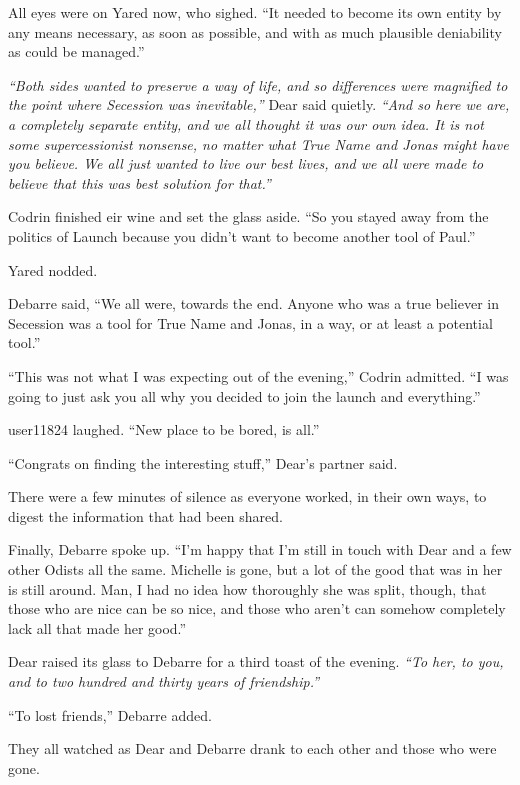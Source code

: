 All eyes were on Yared now, who sighed. ``It needed to become its own entity by any means necessary, as soon as possible, and with as much plausible deniability as could be managed.''

\emph{``Both sides wanted to preserve a way of life, and so differences were magnified to the point where Secession was inevitable,''} Dear said quietly. \emph{``And so here we are, a completely separate entity, and we all thought it was our own idea. It is not some supercessionist nonsense, no matter what True Name and Jonas might have you believe. We all just wanted to live our best lives, and we all were made to believe that this was best solution for that.''}

Codrin finished eir wine and set the glass aside. ``So you stayed away from the politics of Launch because you didn't want to become another tool of Paul.''

Yared nodded.

Debarre said, ``We all were, towards the end. Anyone who was a true believer in Secession was a tool for True Name and Jonas, in a way, or at least a potential tool.''

``This was not what I was expecting out of the evening,'' Codrin admitted. ``I was going to just ask you all why you decided to join the launch and everything.''

user11824 laughed. ``New place to be bored, is all.''

``Congrats on finding the interesting stuff,'' Dear's partner said.

There were a few minutes of silence as everyone worked, in their own ways, to digest the information that had been shared.

Finally, Debarre spoke up. ``I'm happy that I'm still in touch with Dear and a few other Odists all the same. Michelle is gone, but a lot of the good that was in her is still around. Man, I had no idea how thoroughly she was split, though, that those who are nice can be so nice, and those who aren't can somehow completely lack all that made her good.''

Dear raised its glass to Debarre for a third toast of the evening. \emph{``To her, to you, and to two hundred and thirty years of friendship.''}

``To lost friends,'' Debarre added.

They all watched as Dear and Debarre drank to each other and those who were gone.
